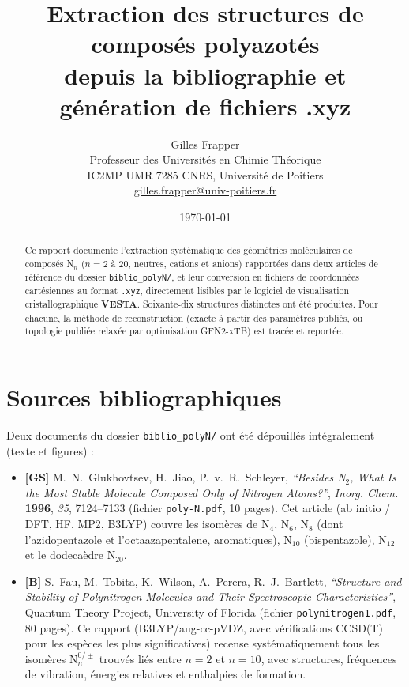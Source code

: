 \documentclass[11pt,a4paper]{article}
\title{\color{accent}\textbf{Extraction des structures de compos\'es polyazot\'es\\
\large depuis la bibliographie et g\'en\'eration de fichiers .xyz}}
\author{Gilles Frapper \\ Professeur des Universit\'es en Chimie Th\'eorique \\ IC2MP UMR 7285 CNRS, Universit\'e de Poitiers \\[2pt] \small \href{mailto:gilles.frapper@univ-poitiers.fr}{gilles.frapper@univ-poitiers.fr}}
\date{\today}
\begin{document}
\maketitle
\thispagestyle{fancy}

\begin{abstract}
\noindent Ce rapport documente l'extraction syst\'ematique des g\'eom\'etries
mol\'eculaires de compos\'es N$_n$ ($n=2$ \`a $20$, neutres, cations et
anions) rapport\'ees dans deux articles de r\'ef\'erence du dossier
\texttt{biblio\_polyN/}, et leur conversion en fichiers de coordonn\'ees
cart\'esiennes au format \texttt{.xyz}, directement lisibles par le
logiciel de visualisation cristallographique \textbf{VESTA}. Soixante-dix
structures distinctes ont \'et\'e produites. Pour chacune, la m\'ethode de
reconstruction (exacte \`a partir des param\`etres publi\'es, ou topologie
publi\'ee relax\'ee par optimisation GFN2-xTB) est trac\'ee et report\'ee.
\end{abstract}

\section{Sources bibliographiques}

Deux documents du dossier \texttt{biblio\_polyN/} ont \'et\'e d\'epouill\'es
int\'egralement (texte et figures) :

\begin{itemize}
  \item \textbf{[GS]} M.~N.~Glukhovtsev, H.~Jiao, P.~v.~R.~Schleyer,
  \emph{``Besides N$_2$, What Is the Most Stable Molecule Composed Only of
  Nitrogen Atoms?''}, \textit{Inorg. Chem.} \textbf{1996}, \textit{35},
  7124--7133 (fichier \texttt{poly-N.pdf}, 10 pages). Cet article
  (ab initio / DFT, HF, MP2, B3LYP) couvre les isom\`eres de N$_4$, N$_6$,
  N$_8$ (dont l'azidopentazole et l'octaazapentalene, aromatiques), N$_{10}$
  (bispentazole), N$_{12}$ et le dodeca\`edre N$_{20}$.

  \item \textbf{[B]} S.~Fau, M.~Tobita, K.~Wilson, A.~Perera, R.~J.~Bartlett,
  \emph{``Structure and Stability of Polynitrogen Molecules and Their
  Spectroscopic Characteristics''}, Quantum Theory Project, University of
  Florida (fichier \texttt{polynitrogen1.pdf}, 80 pages). Ce rapport
  (B3LYP/aug-cc-pVDZ, avec v\'erifications CCSD(T) pour les esp\`eces les
  plus significatives) recense syst\'ematiquement tous les isom\`eres
  N$_n^{0/\pm}$ trouv\'es li\'es entre $n=2$ et $n=10$, avec structures,
  fr\'equences de vibration, \'energies relatives et enthalpies de
  formation.
\end{itemize}
\end{document}
